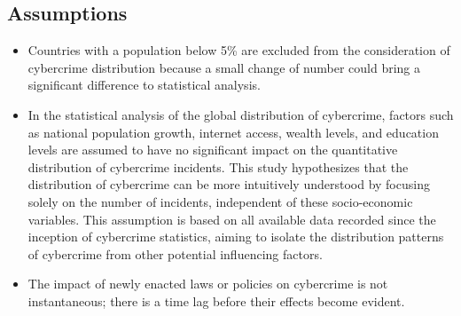 \subsection{Assumptions}\label{subsec:assumptions} %
\begin{itemize}
    \item Countries with a population below 5\% are excluded from the consideration of cybercrime distribution because
        a small change of number could bring a significant difference to statistical analysis.
    \item In the statistical analysis of the global distribution of cybercrime,
        factors such as national population growth, internet access, wealth levels, and education levels
        are assumed to have no significant impact on the quantitative distribution of cybercrime incidents.
        This study hypothesizes that the distribution of cybercrime can be more intuitively understood by focusing solely on the number of incidents,
        independent of these socio-economic variables.
        This assumption is based on all available data recorded since the inception of cybercrime statistics,
        aiming to isolate the distribution patterns of cybercrime from other potential influencing factors.
    \item The impact of newly enacted laws or policies on cybercrime is not instantaneous;
        there is a time lag before their effects become evident.
\end{itemize}
